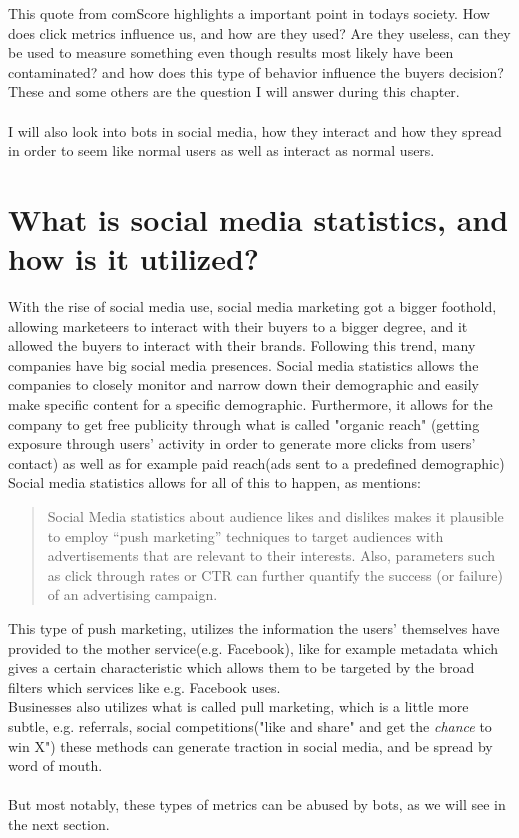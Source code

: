 This quote from comScore highlights a important point in todays society. How does click metrics influence us, and how are they used? Are they useless, can they be used to measure something even though results most likely have been contaminated? and how does this type of behavior influence the buyers decision? These and some others are the question I will answer during this chapter. 
\\
\\
I will also look into bots in social media, how they interact and how they spread in order to seem like normal users as well as interact as normal users. 


\newpage
\section{What is  social media statistics, and how is it utilized?}
With the rise of social media use, social media marketing got a bigger foothold, allowing marketeers to interact with their buyers to a bigger degree, and it allowed the buyers to interact with their brands. Following this trend, many companies have big social media presences. Social media statistics allows the companies to closely monitor and narrow down their demographic and easily make specific content for a specific demographic. Furthermore, it allows for the company to get free publicity through what is called "organic reach" (getting exposure through users' activity in order to generate more clicks from users' contact) as well as for example paid reach(ads sent to a predefined demographic)
Social media statistics allows for all of this to happen, as \cite{Singh2013} mentions:
\begin{quotation}
Social Media statistics about audience likes and dislikes makes it plausible to employ “push marketing” techniques to target audiences with advertisements that are relevant to their interests. Also, parameters such as click through rates or CTR can further quantify the success (or failure) of an advertising campaign. 
\end{quotation}
This type of push marketing, utilizes the information the users' themselves have provided to the mother service(e.g. Facebook), like for example metadata which gives a certain characteristic which allows them to be targeted by the broad filters which services like e.g. Facebook uses. 
\\
Businesses also utilizes what is called pull marketing, which is a little more subtle, e.g. referrals, social competitions("like and share" and get the \textit{chance} to win X") these methods can generate traction in social media, and be spread by word of mouth. 
\\
\\
But most notably, these types of metrics can be abused by bots, as we will see in the next section. 

